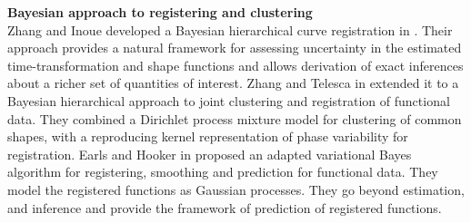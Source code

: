 \noindent
{\bf{Bayesian approach to registering and clustering}} \\
Zhang and Inoue developed a Bayesian hierarchical curve registration in \cite{Telesca_Inoue_2008_JASA}. Their approach provides a natural framework for assessing uncertainty in the estimated time-transformation and shape functions and allows derivation of exact inferences about a richer set of quantities of interest. Zhang and Telesca in \cite{Zhang_Telesca_2014_arXiv} extended it to a Bayesian hierarchical approach to joint clustering and registration of functional data. They combined a Dirichlet process mixture model for clustering of common shapes, with a reproducing kernel representation of phase variability for registration. Earls and Hooker in \cite{Earls_Hooker_2015_arXiv} proposed an adapted variational Bayes algorithm for registering, smoothing and prediction for functional data. They model the registered functions as Gaussian processes. They go beyond estimation, and inference and provide the framework of prediction of registered functions. \\

